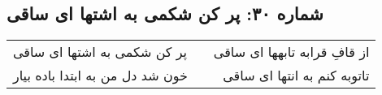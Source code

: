 \begin{center}
\section*{شماره ۳۰: پر کن شکمی به اشتها ای ساقی}
\label{sec:030}
\begin{longtable}{l p{0.5cm} r}
پر کن شکمی به اشتها ای ساقی
&&
از قافِ قرابه تابهها ای ساقی
\\
خون شد دل من به ابتدا باده بیار
&&
تاتوبه کنم به انتها ای ساقی
\\
\end{longtable}
\end{center}
